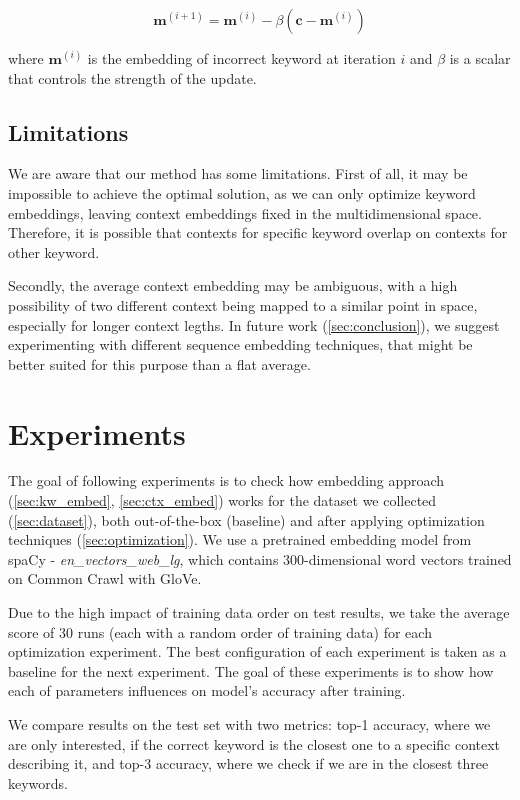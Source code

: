 \documentclass{llncs}
\begin{document}
\begin{equation}
    \label{eq:beta_optimization}
    \bm{m}^{(i+1)} = \bm{m}^{(i)} - \beta(\bm{c} - \bm{m}^{(i)})
\end{equation}

where \(\bm{m}^{(i)}\) is the embedding of incorrect keyword at iteration \(i\) and \(\beta\) is a scalar that controls the strength of the update.

\subsection{Limitations}
\label{sec:limitations}
We are aware that our method has some limitations.
First of all, it may be impossible to achieve the optimal solution, as we can only optimize keyword embeddings, leaving context embeddings fixed in the multidimensional space.
Therefore, it is possible that contexts for specific keyword overlap on contexts for other keyword.

Secondly, the average context embedding may be ambiguous, with a high possibility of two different context being mapped to a similar point in space, especially for longer context legths.
In future work (\ref{sec:conclusion}), we suggest experimenting with different sequence embedding techniques, that might be better suited for this purpose than a flat average.


\section{Experiments}
The goal of following experiments is to check how embedding approach (\ref{sec:kw_embed}, \ref{sec:ctx_embed}) works for the dataset we collected (\ref{sec:dataset}), both out-of-the-box (baseline) and after applying optimization techniques (\ref{sec:optimization}).
We use a pretrained embedding model from spaCy - \textit{en\_vectors\_web\_lg}, which contains 300-dimensional word vectors trained on Common Crawl with GloVe\cite{spacymodel}.

Due to the high impact of training data order on test results, we take the average score of 30 runs (each with a random order of training data) for each optimization experiment.
The best configuration of each experiment is taken as a baseline for the next experiment.
The goal of these experiments is to show how each of parameters influences on model's accuracy after training.

We compare results on the test set with two metrics: top-1 accuracy, where we are only interested, if the correct keyword is the closest one to a specific context describing it, and top-3 accuracy, where we check if we are in the closest three keywords.
\end{document}
